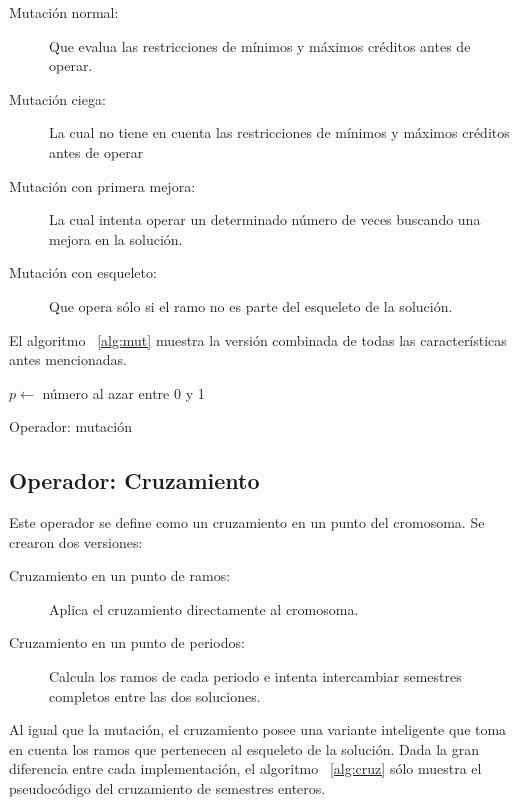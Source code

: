 \documentclass[letter, 10pt]{article}
\begin{document}
\begin{description}
\item[Mutación normal:] Que evalua las restricciones de mínimos y
  máximos créditos antes de operar.
\item[Mutación ciega: ] La cual no tiene en cuenta las restricciones de
  mínimos y máximos créditos antes de operar
\item[Mutación con primera mejora:] La cual intenta operar un
  determinado número de veces buscando una mejora en la solución.
\item[Mutación con esqueleto:] Que opera sólo si el ramo no es parte del
  esqueleto de la solución.
\end{description}

El algoritmo ~\ref{alg:mut} muestra la versión combinada de todas las
características antes mencionadas.


\begin{algorithm}[H]
\SetLine
{}
$p \gets$ número al azar entre 0 y 1 \;

\caption{Operador: mutación}
\label{alg:mut}
\end{algorithm}


\subsection{Operador: Cruzamiento}
Este operador se define como un cruzamiento en un punto del cromosoma. Se crearon dos
versiones:
\begin{description}
\item[Cruzamiento en un punto de ramos:] Aplica el cruzamiento directamente al
  cromosoma.
\item[Cruzamiento en un punto de periodos:] Calcula los ramos de cada periodo e
  intenta intercambiar semestres completos entre las dos soluciones.
\end{description}

Al igual que la mutación, el cruzamiento posee una variante inteligente que toma
en cuenta los ramos que pertenecen al esqueleto de la solución.  Dada la gran
diferencia entre cada implementación, el algoritmo ~\ref{alg:cruz} sólo muestra
el pseudocódigo del cruzamiento de semestres enteros.
\end{document}
